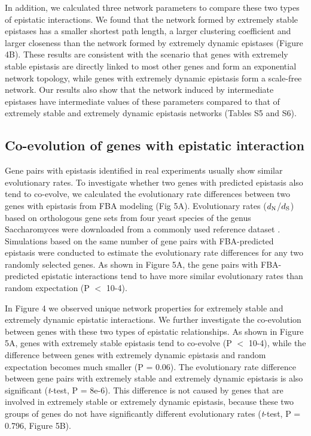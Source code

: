 In addition, we calculated three network parameters to compare these
two types of epistatic interactions. We found that the network formed
by extremely stable epistases has a smaller shortest path length, a
larger clustering coefficient and larger closeness than the network
formed by extremely dynamic epistases (Figure 4B). These results are
consistent with the scenario that genes with extremely stable
epistasis are directly linked to most other genes and form an
exponential network topology, while genes with extremely dynamic
epistasis form a scale-free network. Our results also show that the
network induced by intermediate epistases have intermediate values of
these parameters compared to that of extremely stable and extremely
dynamic epistasis networks (Tables S5 and S6).

\subsection{Co-evolution of genes with epistatic interaction}

Gene pairs with epistasis identified in real experiments usually show
similar evolutionary rates. To investigate whether two genes with
predicted epistasis also tend to co-evolve, we calculated the
evolutionary rate differences between two genes with epistasis from
FBA modeling (Fig 5A). Evolutionary rates
($d_\textnormal{N}$/$d_\textnormal{S}$) based on orthologous gene sets
from four yeast species of the genus Saccharomyces were downloaded
from a commonly used reference dataset \citep{Wall2005}. Simulations
based on the same number of gene pairs with FBA-predicted epistasis
were conducted to estimate the evolutionary rate differences for any
two randomly selected genes. As shown in Figure 5A, the gene pairs
with FBA-predicted epistatic interactions tend to have more similar
evolutionary rates than random expectation (P $<$ 10-4).

In Figure 4 we observed unique network properties for extremely stable
and extremely dynamic epistatic interactions. We further investigate
the co-evolution between genes with these two types of epistatic
relationships. As shown in Figure 5A, genes with extremely stable
epistasis tend to co-evolve (P $<$ 10-4), while the difference between
genes with extremely dynamic epistasis and random expectation becomes
much smaller (P = 0.06). The evolutionary rate difference between gene
pairs with extremely stable and extremely dynamic epistasis is also
significant (\textit{t}-test, P = 8e-6). This difference is not caused by
genes that are involved in extremely stable or extremely dynamic
epistasis, because these two groups of genes do not have significantly
different evolutionary rates (\textit{t}-test, P = 0.796, Figure 5B).

